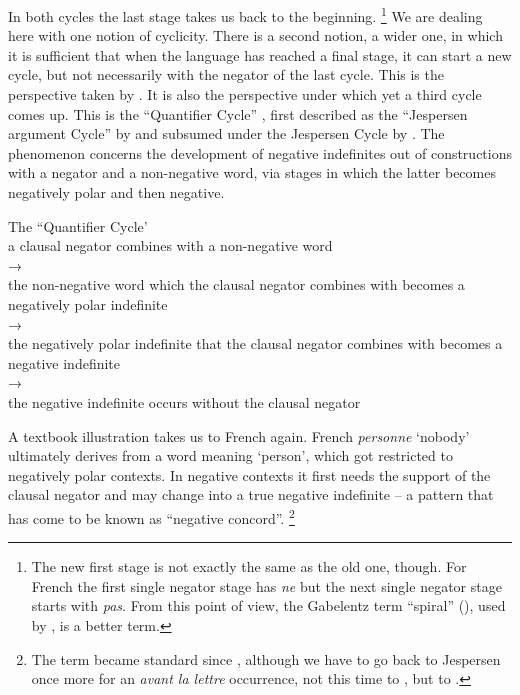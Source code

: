 ﻿\documentclass[output=paper]{langsci/langscibook}
\begin{document}
In both cycles the last stage takes us back to the beginning.%
%
\footnote{The new first stage is not exactly the same as the old one,
though. For French the first single negator stage has \textit{ne} but the
next single negator stage starts with \textit{pas}. From this point of
view, the Gabelentz term ``spiral'' (\citeyear[251]{Gabelentz1891}), used by
\textcite[394]{Meillet1912}, is a better term.} %
%
We are dealing here with one notion of cyclicity. There is a second notion,
a wider one, in which it is sufficient that when the language has reached a
final stage, it can start a new cycle, but not necessarily with the negator
of the last cycle. This is the perspective taken by 
\textcite{Gelderen2011}. It is also the perspective under which yet a third
cycle comes up. This is the ``Quantifier Cycle''
\parencite[e.g.][36]{WillisLucas2013}, first described as the ``Jespersen argument Cycle'' by
\textcite[438]{Ladusaw1993} and subsumed under the Jespersen Cycle by
\textcite{Larrivee2011}. The phenomenon concerns the development of negative
indefinites out of constructions with a negator and a non-negative word,
via stages in which the latter becomes negatively polar and then negative. 
%
\begin{exe}\ex\label{ex:int-qc}
    The ``Quantifier Cycle'\\[1ex]
a clausal negator combines with a non-negative word\\ 
→\\ 
the non-negative word which the clausal negator combines with becomes a
negatively polar indefinite \\
→\\
the negatively polar indefinite that the clausal negator combines with
becomes a negative indefinite\\ 
→\\
the negative indefinite occurs without the clausal negator
\end{exe}
%
A textbook illustration takes us to French again. French \textit{personne}
`nobody' ultimately derives from a word meaning `person', which got
restricted to negatively polar contexts. In negative contexts it first
needs the support of the clausal negator and may change into a true
negative indefinite -- a pattern that has come to be known as ``negative
concord''.%
%
\footnote{The term became standard since \textcite{Giannakidou1998},
although we have to go back to Jespersen once more for an \textit{avant
la lettre} occurrence, not this time to
\textcite{Jespersen1917}, but to \textcite[352]{Jespersen1922}.} %
\end{document}
